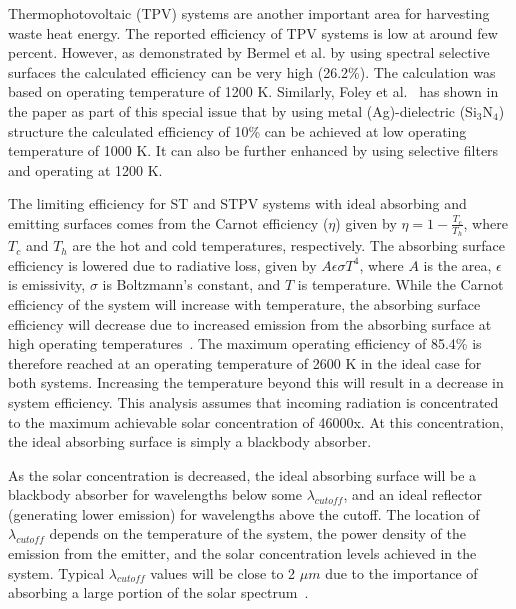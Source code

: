 \documentclass[10pt,letterpaper]{article}
\begin{document}
{Thermophotovoltaic (TPV) systems are another important area for harvesting waste heat energy. The reported efficiency of TPV systems is low at around few percent. However, as demonstrated by Bermel et al. \cite{g4} by using spectral selective surfaces the calculated efficiency can be  very high (26.2\%). The calculation was based on operating temperature of 1200 K. Similarly, Foley et al.~\cite{FUS_OptExp_2015} has shown in the paper as part of this special issue that by using metal (Ag)-dielectric (Si$_3$N$_4$) structure the calculated  efficiency of 10\% can be achieved at low operating temperature of 1000 K.  It can also be further enhanced by using selective filters and operating at 1200 K. 

The limiting efficiency for ST and STPV systems with ideal absorbing and emitting surfaces comes from the Carnot efficiency ($\eta$) 
given by $\eta = 1 - \frac{T_c}{T_h}$, where $T_c$ and $T_h$ are the hot and cold temperatures, respectively. The absorbing 
surface efficiency is lowered due to radiative loss, 
given by $ A \epsilon \sigma T^4$, where $A$ is the area, $\epsilon$ is emissivity, $\sigma$ is Boltzmann's constant, and $T$ is temperature.  
While the Carnot efficiency of the system will increase with temperature, the absorbing surface efficiency will decrease due to 
increased emission from the absorbing surface at high operating temperatures~\cite{L_AIP_2007}.  The maximum operating efficiency 
of 85.4\% is therefore reached at an operating temperature of 2600 K in the ideal case for both systems.  Increasing 
the temperature beyond this will result in a decrease in system efficiency.  This analysis assumes that incoming 
radiation is concentrated to the maximum achievable solar concentration of 46000x.  At this concentration, the 
ideal absorbing surface is simply a blackbody absorber.
 
As the solar concentration is decreased, the ideal absorbing surface will be a blackbody absorber for wavelengths below 
some $\lambda_{cutoff}$, and an ideal reflector (generating lower emission) for wavelengths above the cutoff.  The 
location of $\lambda_{cutoff}$
depends on the temperature of the system, the power density of the emission from the emitter, and the solar concentration 
levels achieved in the system.  Typical $\lambda_{cutoff}$ values will be close to 2 $\mu m$ due to the importance of absorbing a 
large portion of the solar spectrum~\cite{RF_OptExp_2009}.
 
}
\end{document}
